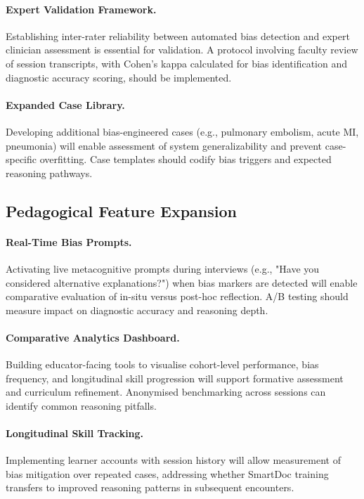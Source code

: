 \paragraph{Expert Validation Framework.}
Establishing inter-rater reliability between automated bias detection and expert clinician
assessment is essential for validation. A protocol involving faculty review of session
transcripts, with Cohen's kappa calculated for bias identification and diagnostic accuracy
scoring, should be implemented.

\paragraph{Expanded Case Library.}
Developing additional bias-engineered cases (e.g., pulmonary embolism, acute MI,
pneumonia) will enable assessment of system generalizability and prevent case-specific
overfitting. Case templates should codify bias triggers and expected reasoning pathways.

\subsection{Pedagogical Feature Expansion}

\paragraph{Real-Time Bias Prompts.}
Activating live metacognitive prompts during interviews (e.g., "Have you considered
alternative explanations?") when bias markers are detected will enable comparative
evaluation of in-situ versus post-hoc reflection. A/B testing should measure impact on
diagnostic accuracy and reasoning depth.

\paragraph{Comparative Analytics Dashboard.}
Building educator-facing tools to visualise cohort-level performance, bias frequency, and
longitudinal skill progression will support formative assessment and curriculum refinement.
Anonymised benchmarking across sessions can identify common reasoning pitfalls.

\paragraph{Longitudinal Skill Tracking.}
Implementing learner accounts with session history will allow measurement of bias
mitigation over repeated cases, addressing whether SmartDoc training transfers to improved
reasoning patterns in subsequent encounters.

